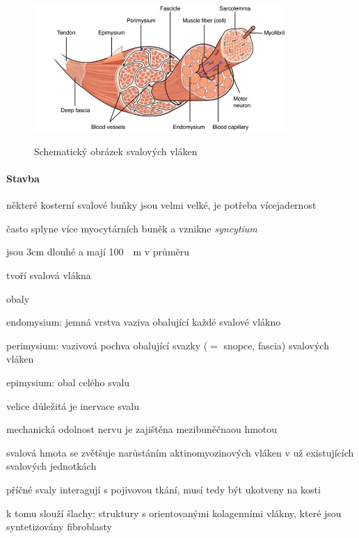 \documentclass[DIV=8]{scrreprt}
\begin{document}
\begin{figure}
    \caption{Schematický obrázek svalových vláken}
    \includegraphics[width=0.85\textwidth]{sval.jpg}
    \centering
    \label{}
\end{figure}


\paragraph{Stavba}
\begin{myItemize}[nosep]
    \item některé kosterní svalové buňky jsou velmi velké, je potřeba vícejadernost
    \item často splyne více myocytárních buněk a vznikne \emph{syncytium}
    \item jsou \si{3cm} dlouhé a mají \si{100 \mu m} v průměru
    \item tvoří svalová vlákna
    \item obaly
\begin{myItemize}[nosep]
    \item endomysium: jemná vrstva vaziva obalující každé svalové vlákno
    \item perimysium: vazivová pochva obalující svazky (\(=\) snopce, fascia) svalových vláken
    \item epimysium: obal celého svalu
\end{myItemize}

    \item velice důležitá je inervace svalu
\begin{myItemize}[nosep]
    \item mechanická odolnost nervu je zajištěna mezibuněčnaou hmotou
\end{myItemize}

    \item svalová hmota se zvětšuje narůstáním aktinomyozinových vláken v už existujících svalových jednotkách
    \item příčné svaly interagují s pojivovou tkání, musí tedy být ukotveny na kosti
\begin{myItemize}[nosep]
    \item k tomu slouží šlachy: struktury s orientovanými kolagenními vlákny, které jsou syntetizovány fibroblasty
\end{myItemize}

\end{myItemize}
\end{document}
